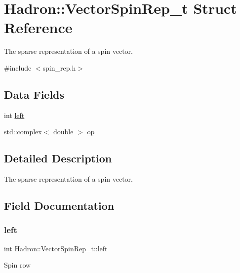 \hypertarget{structHadron_1_1VectorSpinRep__t}{}\section{Hadron\+:\+:Vector\+Spin\+Rep\+\_\+t Struct Reference}
\label{structHadron_1_1VectorSpinRep__t}


The sparse representation of a spin vector.  




{\ttfamily \#include $<$spin\+\_\+rep.\+h$>$}

\subsection*{Data Fields}
\begin{DoxyCompactItemize}
\item 
int \mbox{\hyperlink{structHadron_1_1VectorSpinRep__t_a24eaccc736abff10b54912d3a786a447}{left}}
\item 
std\+::complex$<$ double $>$ \mbox{\hyperlink{structHadron_1_1VectorSpinRep__t_a82c8b541a73cfc5226df4ce6f5970b6c}{op}}
\end{DoxyCompactItemize}


\subsection{Detailed Description}
The sparse representation of a spin vector. 

\subsection{Field Documentation}
\mbox{\label{structHadron_1_1VectorSpinRep__t_a24eaccc736abff10b54912d3a786a447}} 
\subsubsection{\texorpdfstring{left}{left}}
{\footnotesize\ttfamily int Hadron\+::\+Vector\+Spin\+Rep\+\_\+t\+::left}

Spin row \mbox{\label{structHadron_1_1VectorSpinRep__t_a82c8b541a73cfc5226df4ce6f5970b6c}} 
